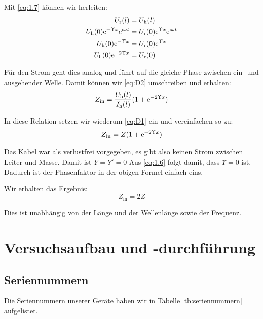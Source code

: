 Mit \eqref{eq:1.7} können wir herleiten:
\begin{align*}
	U_\text r(l) &= U_\text h(l) \\
	U_\text h(0) \mathrm e^{-\Upsilon x} \mathrm e^{\mathrm i \omega t} &= U_\text r(0) \mathrm e^{\Upsilon x} \mathrm e^{\mathrm i \omega t} \\
	U_\text h(0) \mathrm e^{-\Upsilon x} &= U_\text r(0) \mathrm e^{\Upsilon x} \\
	U_\text h(0) \mathrm e^{-2 \Upsilon x} &= U_\text r(0) \\
\end{align*}

Für den Strom geht dies analog und führt auf die gleiche Phase zwischen ein-
und ausgehender Welle. Damit können wir \eqref{eq:D2} umschreiben und erhalten:
\[
	Z_\text{in}
	= \frac{U_\text h (l)}{I_\text h (l)} (1 + \mathrm e^{-2 \Upsilon x})
\]

In diese Relation setzen wir wiederum \eqref{eq:D1} ein und vereinfachen so zu:
\[
	Z_\text{in}
	= Z (1 + \mathrm e^{-2 \Upsilon x})
\]

Das Kabel war als verlustfrei vorgegeben, es gibt also keinen Strom zwischen
Leiter und Masse. Damit ist $Y = Y' = 0$ Aus \eqref{eq:1.6} folgt damit, dass
$\Upsilon = 0$ ist. Dadurch ist der Phasenfaktor in der obigen Formel einfach
eins.

Wir erhalten das Ergebnis:
\[
	Z_\text{in} = 2 Z
\]

Dies ist unabhängig von der Länge und der Wellenlänge sowie der Frequenz.


\section{Versuchsaufbau und -durchführung}

\subsection{Seriennummern}

Die Seriennummern unserer Geräte haben wir in Tabelle \ref{tb:seriennummern}
aufgelistet.

